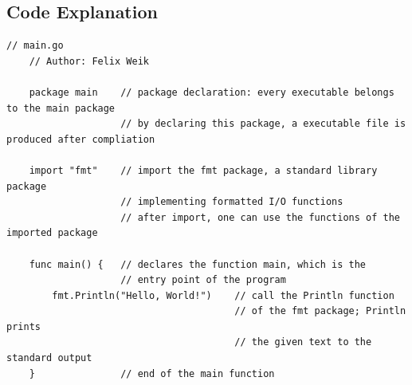 \subsection{Code Explanation}
\begin{lstlisting}[language=Golang]
    // main.go 
    // Author: Felix Weik

    package main    // package declaration: every executable belongs to the main package
                    // by declaring this package, a executable file is produced after compliation
    
    import "fmt"    // import the fmt package, a standard library package 
                    // implementing formatted I/O functions
                    // after import, one can use the functions of the imported package

    func main() {   // declares the function main, which is the 
                    // entry point of the program
        fmt.Println("Hello, World!")    // call the Println function 
                                        // of the fmt package; Println prints 
                                        // the given text to the standard output
    }               // end of the main function
\end{lstlisting}


